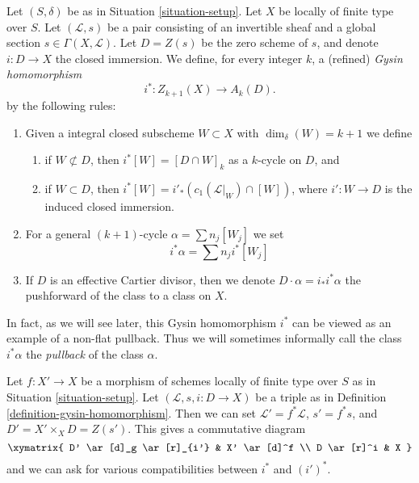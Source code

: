 \begin{definition}
\label{definition-gysin-homomorphism}
Let $(S, \delta)$ be as in Situation \ref{situation-setup}.
Let $X$ be locally of finite type over $S$.
Let $(\mathcal{L}, s)$ be a pair consisting of an invertible
sheaf and a global section $s \in \Gamma(X, \mathcal{L})$.
Let $D = Z(s)$ be the zero scheme of $s$, and
denote $i : D \to X$ the closed immersion.
We define, for every integer $k$, a (refined) {\it Gysin homomorphism}
$$
i^* : Z_{k + 1}(X) \to A_k(D).
$$
by the following rules:
\begin{enumerate}
\item Given a integral closed subscheme $W \subset X$ with
$\dim_\delta(W) = k + 1$ we define
\begin{enumerate}
\item if $W \not \subset D$, then $i^*[W] = [D \cap W]_k$ as a
$k$-cycle on $D$, and
\item if $W \subset D$, then
$i^*[W] = i'_*(c_1(\mathcal{L}|_W) \cap [W])$,
where $i' : W \to D$ is the induced closed immersion.
\end{enumerate}
\item For a general $(k + 1)$-cycle $\alpha = \sum n_j[W_j]$
we set
$$
i^*\alpha = \sum n_j i^*[W_j]
$$
\item If $D$ is an effective Cartier divisor, then we denote
$D \cdot \alpha = i_*i^*\alpha$ the pushforward of
the class to a class on $X$.
\end{enumerate}
\end{definition}

\noindent
In fact, as we will see later, this Gysin homomorphism $i^*$ can be viewed
as an example of a non-flat pullback. Thus we will sometimes informally
call the class $i^*\alpha$ the {\it pullback} of the class $\alpha$.

\begin{remark}
\label{remark-pullback-pairs}
Let $f : X' \to X$ be a morphism of schemes locally of finite type over $S$
as in Situation \ref{situation-setup}. Let $(\mathcal{L}, s, i : D \to X)$
be a triple as in Definition \ref{definition-gysin-homomorphism}.
Then we can set $\mathcal{L}' = f^*\mathcal{L}$, $s' = f^*s$, and
$D' = X' \times_X D = Z(s')$. This gives a commutative diagram
$$
\xymatrix{
D' \ar[d]_g \ar[r]_{i'} & X' \ar[d]^f \\
D \ar[r]^i & X
}
$$
and we can ask for various compatibilities between $i^*$ and $(i')^*$.
\end{remark}

